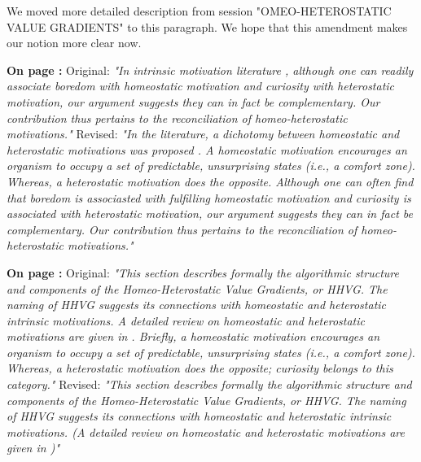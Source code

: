 \documentclass[utf8]{article}
\newenvironment{reply}  
    {\color{Blue}\noindent\newline}
    {\newline}
\newcommand{\revise}[3]{
    \noindent
    \newline
    \textbf{On page {#1}:}\newline
    \newline
    Original:\newline
    \textit{"#2"}
    \newline
    \newline
    Revised:\newline
    \textit{"#3"}\newline}
\begin{document}
        
        \begin{reply}
            We moved more detailed description from session "OMEO-HETEROSTATIC VALUE GRADIENTS" to this paragraph. We hope that this amendment makes our notion more clear now.
        
            \revise{\pageref{rev:HomoVsHetero}}
                {In intrinsic motivation literature \citep{intrinsicmotiv}, although one can readily associate boredom with homeostatic motivation and curiosity with heterostatic motivation, our argument suggests they can in fact be complementary. Our contribution thus pertains to the reconciliation of homeo-heterostatic motivations.}
                {In the literature, a dichotomy between homeostatic and heterostatic motivations was proposed \citep{intrinsicmotiv}. A homeostatic motivation encourages an organism to occupy a set of predictable, unsurprising states (i.e., a {\it comfort zone}). Whereas, a heterostatic motivation does the opposite. Although one can often find that boredom is associasted with fulfilling homeostatic motivation and curiosity is associated with heterostatic motivation, our argument suggests they can in fact be complementary. Our contribution thus pertains to the reconciliation of homeo-heterostatic motivations.}
                
            \revise{\pageref{rev:HomoVsHetero2}}
                {This section describes formally the algorithmic structure and components of the Homeo-Heterostatic Value Gradients, or HHVG. The naming of HHVG suggests its connections with homeostatic and heterostatic intrinsic motivations. A detailed review on homeostatic and heterostatic motivations are given in \cite{intrinsicmotiv}. Briefly, a homeostatic motivation encourages an organism to occupy a set of predictable, unsurprising states (i.e., a {\it comfort zone}). Whereas, a heterostatic motivation does the opposite; curiosity belongs to this category.}
                {This section describes formally the algorithmic structure and components of the Homeo-Heterostatic Value Gradients, or HHVG. The naming of HHVG suggests its connections with homeostatic and heterostatic intrinsic motivations. (A detailed review on homeostatic and heterostatic motivations are given in \cite{intrinsicmotiv})}

        \end{reply}
        
        
        
\end{document}
